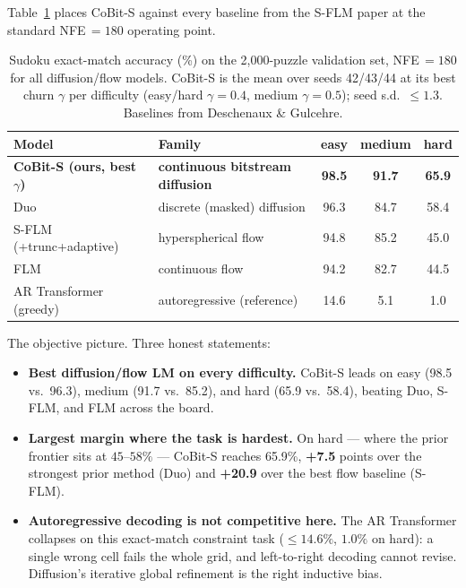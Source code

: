 \documentclass[11pt]{article}
\newcommand{\best}[1]{\textbf{#1}}
\begin{document}
Table~\ref{tab:main} places CoBit-S against every baseline from the S-FLM paper at the standard
NFE\,$=180$ operating point.

\begin{table}[h]
\centering
\caption{Sudoku exact-match accuracy (\%) on the 2{,}000-puzzle validation set, NFE\,$=180$ for all
diffusion/flow models. CoBit-S is the mean over seeds 42/43/44 at its best churn $\gamma$ per difficulty
(easy/hard $\gamma{=}0.4$, medium $\gamma{=}0.5$); seed s.d.\ $\leq 1.3$. Baselines from
Deschenaux \& Gulcehre.}
\label{tab:main}
\small
\begin{tabular}{l l c c c}
\toprule
\textbf{Model} & \textbf{Family} & \textbf{easy} & \textbf{medium} & \textbf{hard}\\
\midrule
\best{CoBit-S (ours, best $\gamma$)} & \best{continuous bitstream diffusion} & \best{98.5} & \best{91.7} & \best{65.9}\\
Duo                        & discrete (masked) diffusion & 96.3 & 84.7 & 58.4\\
S-FLM (+trunc+adaptive)    & hyperspherical flow         & 94.8 & 85.2 & 45.0\\
FLM                        & continuous flow             & 94.2 & 82.7 & 44.5\\
AR Transformer (greedy)    & autoregressive (reference)  & 14.6 & \phantom{0}5.1 & \phantom{0}1.0\\
\bottomrule
\end{tabular}
\end{table}

\noindent The objective picture. Three honest statements:
\begin{itemize}
\item \textbf{Best diffusion/flow LM on every difficulty.} CoBit-S leads on easy (98.5 vs.\ 96.3),
medium (91.7 vs.\ 85.2), and hard (65.9 vs.\ 58.4), beating Duo, S-FLM, and FLM across the board.
\item \textbf{Largest margin where the task is hardest.} On hard --- where the prior frontier sits at
$45$--$58\%$ --- CoBit-S reaches 65.9\%, \textbf{+7.5} points over the strongest prior method (Duo) and
\textbf{+20.9} over the best flow baseline (S-FLM).
\item \textbf{Autoregressive decoding is not competitive here.} The AR Transformer collapses on this
exact-match constraint task ($\leq 14.6\%$, $1.0\%$ on hard): a single wrong cell fails the whole grid, and
left-to-right decoding cannot revise. Diffusion's iterative global refinement is the right inductive bias.
\end{itemize}
\end{document}
